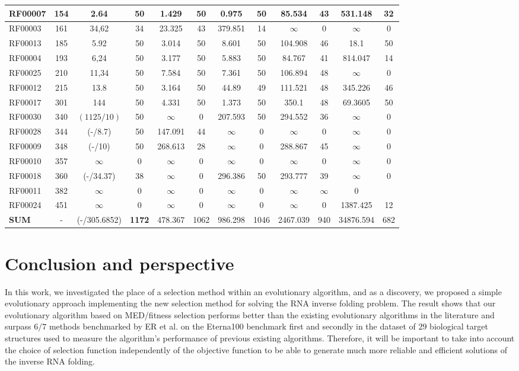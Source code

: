 \documentclass[english,12pt,a4paper]{article}
\theoremstyle{definition}
\begin{document}
\begin{center}
\begin{table}[H]
\begin{tabular}[H]{p{1.2cm}ccccccccccc|}
			\hline
			RF00007 &154&2.64&50&1.429 &50&0.975&50&85.534&43&531.148&32\\
			\hline
			RF00003&161&34,62&34&23.325&43&379.851&14&$\infty$&0&$\infty$&0\\
			\hline
			RF00013 &185&5.92&50&3.014&50&8.601&50&104.908&46&18.1&50\\
			\hline
			RF00004 &193&6,24&50&3.177&50&5.883&50&84.767&41&814.047&14\\
			\hline
			RF00025 &210&11,34&50&7.584&50&7.361&50&106.894&48&$\infty$&0\\
			\hline
			RF00012 &215&13.8&50&3.164&50&44.89&49&111.521&48&345.226&46\\
			\hline
			RF00017 &301&144&50&4.331&50&1.373&50&350.1&48&69.3605&50\\
			\hline
			RF00030 &340&$(1125/10)$&50&$\infty$&0&207.593&50&294.552&36&$\infty$&0\\
			\hline
			RF00028&344&(-/8.7)&50&147.091&44&$\infty$&0&$\infty$&0&$\infty$&0\\
			\hline
			RF00009 &348&(-/10)&50&268.613 &28&$\infty$&0&288.867&45&$\infty$&0\\
			\hline
			RF00010 &357&$\infty$&0&$\infty$&0&$\infty$&0&$\infty$&0&$\infty$&0\\
			\hline
			RF00018 &360&(-/34.37)&38&$\infty$&0&296.386&50&293.777&39&$\infty$&0\\
			\hline
			RF00011&382&$\infty$&$0$&$\infty$&0&$\infty$&0&$\infty$&$\infty$&0\\
			\hline
			RF00024 &451&$\infty$&0&$\infty$&0&$\infty$&0&$\infty$&0&1387.425&12\\
			\hline
			\textbf{SUM} &-&(-/305.6852)&\textbf{1172}&478.367&1062&986.298&1046&2467.039&940&34876.594&682\\
			\hline
		\end{tabular}
	\end{table}
\end{center}

\section{Conclusion and perspective}

In this work, we investigated the place of a selection method within an evolutionary algorithm, and as a discovery, we proposed a simple evolutionary approach implementing the new selection method for solving the RNA inverse folding problem. The result shows that our evolutionary algorithm based on MED/fitness selection performs better than the existing evolutionary algorithms in the literature and surpass $6/7$ methods benchmarked by ER et al.\cite{shi2018sentrna} on the Eterna100 benchmark first and secondly in the dataset of $29$ biological target structures used to measure the algorithm's performance of previous existing algorithms. Therefore, it will be important to take into account the choice of  selection function independently of the objective function to be able to generate much more reliable and efficient solutions of the inverse RNA folding.


\newpage
\renewcommand{\bibname}{References}


\end{document}
